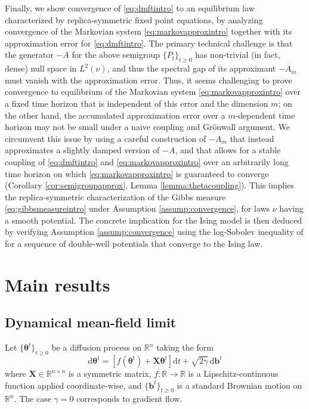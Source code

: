 \documentclass[11pt,letterpaper,reqno]{amsart}
\def\R{\mathbb{R}}
\def\d{\mathrm{d}}
\def\btheta{\boldsymbol{\theta}}
\def\X{\mathbf{X}}
\def\b{\mathbf{b}}
\theoremstyle{definition}
\numberwithin{equation}{section}
\begin{document}
Finally, we show convergence of \eqref{eq:dmftintro} to an equilibrium law
characterized by replica-symmetric fixed point equations, by analyzing 
convergence of the Markovian system \eqref{eq:markovapproxintro} together with
its approximation error for \eqref{eq:dmftintro}. The primary technical
challenge is that the generator ${-}A$ for the above semigroup
$\{P_t\}_{t \geq 0}$ has non-trivial (in fact, dense)
null space in $L^2(\nu)$, and thus the spectral gap of its approximant ${-}A_m$ must vanish with the
approximation error. Thus, it seems challenging to prove convergence to
equilibrium of the Markovian
system \eqref{eq:markovapproxintro} over a fixed time horizon that is
independent of this error and the dimension $m$; on the other hand,
the accumulated approximation error over a $m$-dependent time horizon may not be
small under a naive coupling and Gr\"onwall argument.
We circumvent this issue by using a careful
construction of ${-}A_m$ that instead approximates a slightly damped version of
${-}A$, and that allows for a stable coupling of
\eqref{eq:dmftintro} and \eqref{eq:markovapproxintro} over an arbitrarily long
time horizon on which \eqref{eq:markovapproxintro} is guaranteed to converge
(Corollary \ref{cor:semigroupapprox}, Lemma \ref{lemma:thetacoupling}). 
This implies the replica-symmetric characterization of the Gibbs measure
\eqref{eq:gibbsmeasureintro} under Assumption \ref{assump:convergence}, for
laws $\nu$ having a smooth potential. The concrete implication for the Ising
model is then deduced by verifying Assumption \ref{assump:convergence} using the
log-Sobolev inequality of \cite{bauerschmidt2019very} for a
sequence of double-well potentials that converge to the Ising law.

\section{Main results}\label{sec:results}

\subsection{Dynamical mean-field limit}

Let $\{\btheta^t\}_{t \geq 0}$ be a diffusion process on $\R^n$ taking the form
\begin{equation}\label{eq:dynamics}
\d\btheta^t=[f(\btheta^t)+\X\btheta^t]\d t+\sqrt{2\gamma}\,\d \b^t
\end{equation}
where $\X \in \R^{n \times n}$ is a symmetric matrix, $f:\R \to \R$ is a
Lipschitz-continuous function applied coordinate-wise, and $\{\b^t\}_{t \geq 0}$
is a standard Brownian motion on $\R^n$. The case $\gamma=0$ corresponds to gradient flow.  
\end{document}
